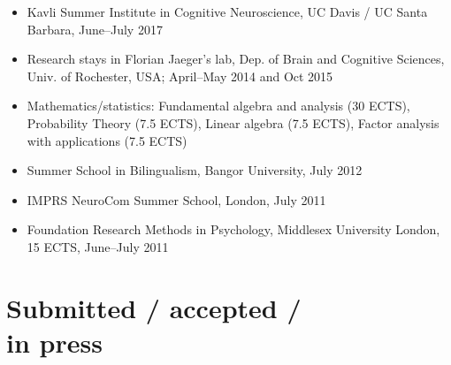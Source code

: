 \documentclass[margin, 11pt]{res} %
\begin{document}
\begin{resume}
\begin{itemize}
\item Kavli Summer Institute in Cognitive Neuroscience, UC Davis / UC Santa Barbara, June--July 2017

\item Research stays in Florian Jaeger's lab, Dep. of Brain and Cognitive Sciences, Univ. of Rochester, USA; April--May 2014 and Oct 2015

\item Mathematics/statistics: 
Fundamental algebra and analysis (30 ECTS), Probability Theory (7.5 ECTS), Linear algebra (7.5 ECTS), Factor analysis with applications (7.5 ECTS)

\item Summer School in Bilingualism, Bangor University, July 2012
 
\item IMPRS NeuroCom Summer School, London, July 2011 

\item Foundation Research Methods in Psychology, Middlesex University London, 15 ECTS, June--July 2011

\end{itemize}









\section{\sc Submitted / accepted /\\in press}


\end{resume}
\end{document}
